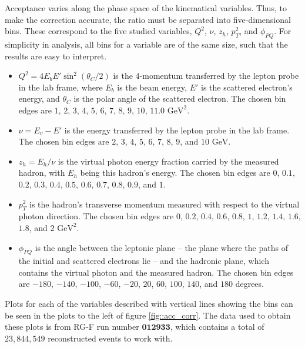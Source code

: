     Acceptance varies along the phase space of the kinematical variables.
    Thus, to make the correction accurate, the ratio must be separated into five-dimensional bins.
    These correspond to the five studied variables, $Q^2$, $\nu$, $z_h$, $p_T^2$, and $\phi_{PQ}$.
    For simplicity in analysis, all bins for a variable are of the same size, such that the results are easy to interpret.
    \begin{itemize}
        \item
            $Q^2 = 4E_bE'\sin^2(\theta_C/2)$ is the 4-momentum transferred by the lepton probe in the lab frame, where $E_b$ is the beam energy, $E'$ is the scattered electron's energy, and $\theta_C$ is the polar angle of the scattered electron.
            The chosen bin edges are $1$, $2$, $3$, $4$, $5$, $6$, $7$, $8$, $9$, $10$, $11.0$ $\text{GeV}^2$.
        \item
            $\nu = E_v - E'$ is the energy transferred by the lepton probe in the lab frame.
            The chosen bin edges are $2$, $3$, $4$, $5$, $6$, $7$, $8$, $9$, and $10$ $\text{GeV}$.
        \item
            $z_h = E_h/\nu$ is the virtual photon energy fraction carried by the measured hadron, with $E_h$ being this hadron's energy.
            The chosen bin edges are $0$, $0.1$, $0.2$, $0.3$, $0.4$, $0.5$, $0.6$, $0.7$, $0.8$, $0.9$, and $1$.
        \item
            $p_T^2$ is the hadron's transverse momentum measured with respect to the virtual photon direction.
            The chosen bin edges are $0$, $0.2$, $0.4$, $0.6$, $0.8$, $1$, $1.2$, $1.4$, $1.6$, $1.8$, and $2$ $\text{GeV}^2$.
        \item
            $\phi_{PQ}$ is the angle between the leptonic plane -- the plane where the paths of the initial and scattered electrons lie -- and the hadronic plane, which contains the virtual photon and the measured hadron.
            The chosen bin edges are $-180$, $-140$, $-100$, $-60$, $-20$, $20$, $60$, $100$, $140$, and $180$ degrees.
    \end{itemize}

    Plots for each of the variables described with vertical lines showing the bins can be seen in the plots to the left of figure \ref{fig::acc_corr}.
    The data used to obtain these plots is from RG-F run number $\mathbf{012933}$, which contains a total of $23,844,549$ reconstructed events to work with.

